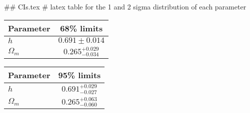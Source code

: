 ## CIs.tex
# latex table for the 1 and 2 sigma distribution of each parameter

\begin{tabular} { l  c}
 Parameter &  68\% limits\\
\hline
{\boldmath$h              $} & $0.691\pm 0.014            $\\
{\boldmath$\Omega_m       $} & $0.265^{+0.029}_{-0.034}   $\\
\hline
\end{tabular}

\begin{tabular} { l  c}
 Parameter &  95\% limits\\
\hline
{\boldmath$h              $} & $0.691^{+0.029}_{-0.027}   $\\
{\boldmath$\Omega_m       $} & $0.265^{+0.063}_{-0.060}   $\\
\hline
\end{tabular}
